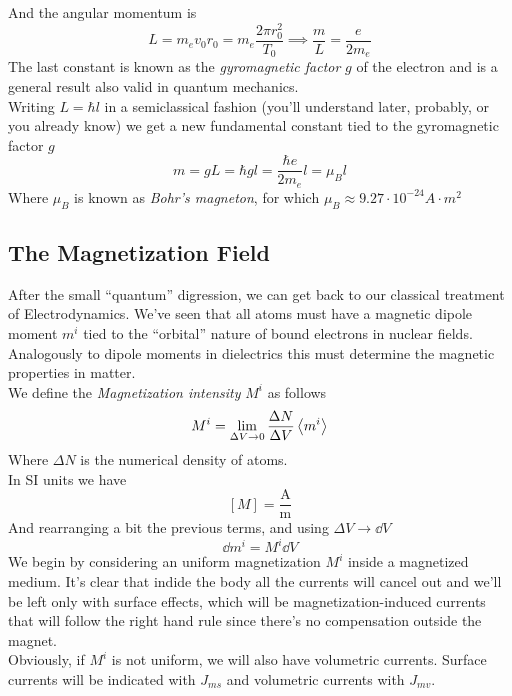 \documentclass[../electromagnetism.tex]{subfiles}
\begin{document}
And the angular momentum is
\begin{equation*}
	L=m_ev_0r_0=m_e\frac{2\pi r_0^2}{T_0}\implies\frac{m}{L}=\frac{e}{2m_e}
\end{equation*}
The last constant is known as the \textit{gyromagnetic factor} $g$ of the electron and is a general result also valid in quantum mechanics.\\
Writing $L=\hbar l$ in a semiclassical fashion (you'll understand later, probably, or you already know) we get a new fundamental constant tied to the gyromagnetic factor $g$
\begin{equation*}
	m=gL=\hbar gl=\frac{\hbar e}{2m_e}l=\mu_Bl
\end{equation*}
Where $\mu_B$ is known as \textit{Bohr's magneton}, for which $\mu_B\approx 9.27\cdot10^{-24}\unit{A\cdot m^2}$
\subsection{The Magnetization Field}
After the small ``quantum'' digression, we can get back to our classical treatment of Electrodynamics. We've seen that all atoms must have a magnetic dipole moment $m^i$ tied to the ``orbital'' nature of bound electrons in nuclear fields. Analogously to dipole moments in dielectrics this must determine the magnetic properties in matter.\\
We define the \textit{Magnetization intensity} $M^i$ as follows
\begin{equation}
	M^i=\lim_{\Delta V\to 0}\frac{\Delta N}{\Delta V}\expval{m^i}
	\label{eq:magintdef}
\end{equation}
Where $\Delta N$ is the numerical density of atoms.\\
In SI units we have
\begin{equation*}
	\left[ M \right]=\mathrm{\frac{A}{m}}
\end{equation*}
And rearranging a bit the previous terms, and using $\Delta V\to \dd V$
\begin{equation}
	\dd m^i=M^i\dd V
	\label{eq:magvsmagdip}
\end{equation}
We begin by considering an uniform magnetization $M^i$ inside a magnetized medium. It's clear that indide the body all the currents will cancel out and we'll be left only with surface effects, which will be magnetization-induced currents that will follow the right hand rule since there's no compensation outside the magnet.\\
Obviously, if $M^i$ is not uniform, we will also have volumetric currents. Surface currents will be indicated with $J_{ms}$ and volumetric currents with $J_{mv}$.\\
\end{document}

